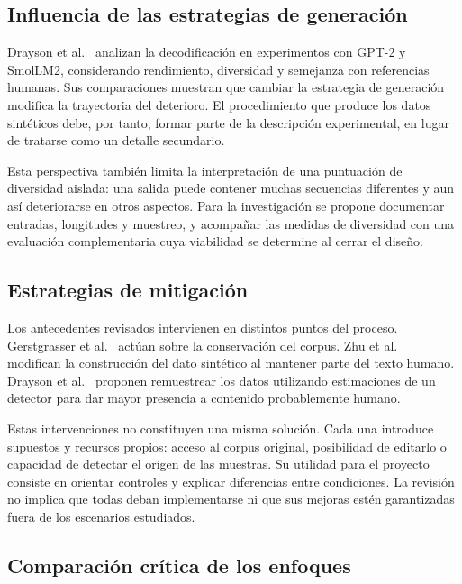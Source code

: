 \documentclass[12pt,letterpaper]{article}
\begin{document}
\subsection{Influencia de las estrategias de generación}

Drayson et al.\ \cite{drayson2025} analizan la decodificación en experimentos
con GPT-2 y SmolLM2, considerando rendimiento, diversidad y semejanza con
referencias humanas. Sus comparaciones muestran que cambiar la estrategia
de generación modifica la trayectoria del deterioro. El procedimiento
que produce los datos sintéticos debe, por tanto, formar parte de la
descripción experimental, en lugar de tratarse como un detalle secundario.

Esta perspectiva también limita la interpretación de una puntuación de
diversidad aislada: una salida puede contener muchas secuencias diferentes
y aun así deteriorarse en otros aspectos. Para la investigación se propone
documentar entradas, longitudes y muestreo, y acompañar las medidas de
diversidad con una evaluación complementaria cuya viabilidad se determine
al cerrar el diseño.

\subsection{Estrategias de mitigación}

Los antecedentes revisados intervienen en distintos puntos del proceso.
Gerstgrasser et al.\ \cite{gerstgrasser2024} actúan sobre la conservación
del corpus. Zhu et al.\ \cite{zhu2025} modifican la construcción del dato
sintético al mantener parte del texto humano. Drayson et al.\
\cite{drayson2025} proponen remuestrear los datos utilizando estimaciones
de un detector para dar mayor presencia a contenido probablemente humano.

Estas intervenciones no constituyen una misma solución. Cada una introduce
supuestos y recursos propios: acceso al corpus original, posibilidad de
editarlo o capacidad de detectar el origen de las muestras. Su utilidad
para el proyecto consiste en orientar controles y explicar diferencias entre
condiciones. La revisión no implica que todas deban implementarse ni que
sus mejoras estén garantizadas fuera de los escenarios estudiados.

\subsection{Comparación crítica de los enfoques}
\end{document}
